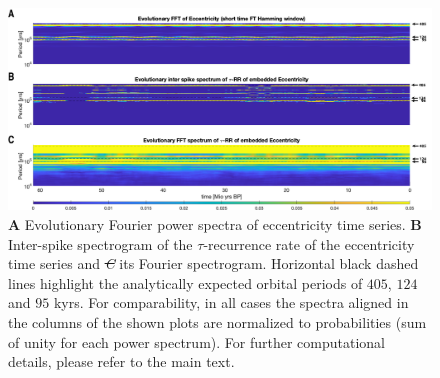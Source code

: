 \documentclass[entropy,article,submit,pdftex,moreauthors]{Definitions/mdpi}
\providecommand{\DIFadd}[1]{{\protect\color{blue}\uwave{#1}}} %
\providecommand{\DIFdel}[1]{{\protect\color{red}\sout{#1}}}                      %
\providecommand{\DIFaddFL}[1]{\DIFadd{#1}} %
\providecommand{\DIFdelFL}[1]{\DIFdel{#1}} %
\providecommand{\DIFaddbeginFL}{} %
\providecommand{\DIFaddendFL}{} %
\providecommand{\DIFdelbeginFL}{} %
\providecommand{\DIFdelendFL}{} %
\begin{document}
\begin{figure}
 \centering
 \DIFdelbeginFL %
\DIFdelendFL \DIFaddbeginFL \includegraphics[width=\textwidth]{figures/fig_laskar_spectra}
 \DIFaddendFL \caption{\textbf{A} Evolutionary Fourier power spectra of eccentricity time series. \textbf{B} Inter-spike spectrogram of the $\tau$-recurrence rate of the eccentricity time 
 series and \DIFdelbeginFL \textit{\DIFdelFL{C}} %
\DIFdelendFL \DIFaddbeginFL \textbf{\DIFaddFL{C}} \DIFaddendFL its Fourier spectrogram. Horizontal black dashed lines highlight the analytically expected orbital periods of $405$, $124$ and $95$ kyrs. 
 For comparability, in all cases the spectra aligned in the columns of the shown plots are normalized to probabilities (sum of unity for 
 each power spectrum). For further computational details, please refer to the main text.}  
\label{fig_laskar_spectra}
\end{figure}
\end{document}
